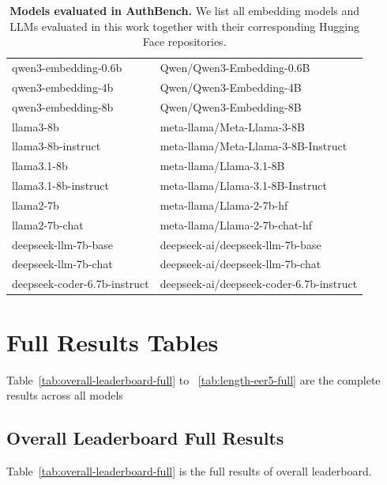 \documentclass{article}
\begin{document}
\begin{table}[h!]
{\begin{tabular}{ll}
qwen3-embedding-0.6b & Qwen/Qwen3-Embedding-0.6B \\
qwen3-embedding-4b & Qwen/Qwen3-Embedding-4B \\
qwen3-embedding-8b & Qwen/Qwen3-Embedding-8B \\
llama3-8b & meta-llama/Meta-Llama-3-8B \\
llama3-8b-instruct & meta-llama/Meta-Llama-3-8B-Instruct \\
llama3.1-8b & meta-llama/Llama-3.1-8B \\
llama3.1-8b-instruct & meta-llama/Llama-3.1-8B-Instruct \\
llama2-7b & meta-llama/Llama-2-7b-hf \\
llama2-7b-chat & meta-llama/Llama-2-7b-chat-hf \\
deepseek-llm-7b-base & deepseek-ai/deepseek-llm-7b-base \\
deepseek-llm-7b-chat & deepseek-ai/deepseek-llm-7b-chat \\
deepseek-coder-6.7b-instruct & deepseek-ai/deepseek-coder-6.7b-instruct \\
\bottomrule
\end{tabular}
}
\caption{\textbf{Models evaluated in AuthBench.}
We list all embedding models and LLMs evaluated in this work together with their
corresponding Hugging Face repositories.}
\label{tab:models-evaluated}
\end{table}


\section{Full Results Tables}
\label{sec:appendix-full-results}
Table~\ref{tab:overall-leaderboard-full} to ~\ref{tab:length-eer5-full} are the complete results across all models
%  

\subsection{Overall Leaderboard Full Results}
Table~\ref{tab:overall-leaderboard-full} is the full results of overall leaderboard.
\end{document}

